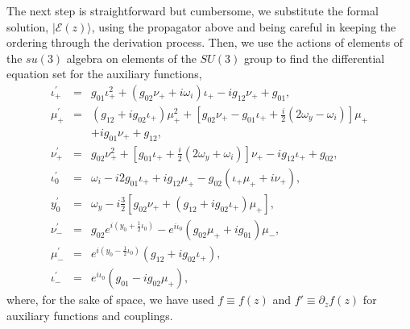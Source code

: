 \documentclass[9pt,twocolumn,twoside]{osajnl}
\begin{document}
The next step is straightforward but cumbersome, we substitute the formal solution, $\vert \mathcal{E}(z) \rangle$, using the propagator above and being careful in keeping the ordering through the derivation process. 
Then, we use the actions of elements of the $su(3)$ algebra on elements of the $SU(3)$ group \cite{Nelson1967p857} to find the differential equation set for the auxiliary functions,
\begin{eqnarray}
	\iota_{+}^{\prime} &=&  g_{01} \iota_{+}^{2} +  \left( g_{02} \nu_{+} + i \omega_{i} \right) \iota_{+}  - i g_{12} \nu_{+} + g_{01}    ,    \label{eq:iota} \\
	\mu_{+}^{\prime} &=& \left(g_{12} + i g_{02} \iota_{+} \right)\mu_{+}^{2} + \left[ g_{02} \nu_{+} - g_{01} \iota_{+} + \frac{i}{2} \left(2\omega_{y} - \omega_{i} \right)\right] \mu_{+} \nonumber \\ && + i g_{01} \nu_{+} + g_{12}, \\
	\nu_{+}^{\prime} &=& g_{02} \nu_{+}^{2} +  \left[ g_{01} \iota_{+} + \frac{i}{2} \left( 2 \omega_{y} + \omega_{i}  \right) \right] \nu_{+}  - i g_{12} \iota_{+} + g_{02}  , \label{eq:mu} \\
	\iota_{0}^{\prime} &=& \omega_{i} - i 2  g_{01} \iota_{+} + i g_{12} \mu_{+} - g_{02} \left( \iota_{+} \mu_{+} + i \nu_{+} \right) , \\
	y_{0}^{\prime} &=& \omega_{y} - i\frac{3}{2}  
	[ g_{02}   \nu_{+} +    
	( g_{12} + i  g_{02} \iota_{+})\mu_{+}],  \\
	\nu_{-}^{\prime} &=& g_{02} e^{i  \left( y_0 + \frac{1}{2} \iota_0 \right)}
	 -  e^{i\iota_{0}}   \left( g_{02} \mu_{+} + i  g_{01} \right) \mu_{-} ,  \\
	\mu_{-}^{\prime} &=&  e^{i  \left( y_0 - \frac{1}{2} \iota_0 \right)}
	( g_{12} + i g_{02} \iota_{+}),\\
	\iota_{-}^{\prime} &=& e^{i \iota_{0}} \left( g_{01} - i g_{02}\mu_{+} \right), 
\end{eqnarray}
where, for the sake of space, we have used $f \equiv f(z)$ and $f' \equiv \partial_{z} f(z)$ for auxiliary functions and couplings.
\end{document}
